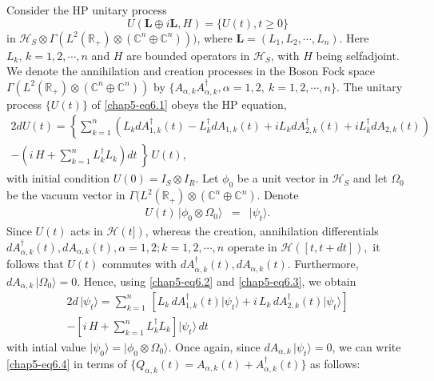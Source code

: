 Consider the HP unitary process 
\begin{equation} 
U(\mathbf{L}\oplus i\mathbf{L}, H)=\{U(t), t\geq 0\} \label{chap5-eq6.1}
\end{equation}
in $\mathcal{H}_S\otimes \Gamma(L^2(\mathbb{R}_+)\otimes (\mathbb{C}^{n}\oplus \mathbb{C}^{n})))$, where $\mathbf{L}=(L_1,L_2,\cdots, L_n)$. Here  $L_k,\, k=1,2,\cdots, n$ and $H$ are  bounded operators in  $\mathcal{H}_S$, with $H$ being selfadjoint.  We denote the annihilation and creation processes in the Boson Fock space $\Gamma(L^2(\mathbb{R}_+)\otimes (\mathbb{C}^{n}\oplus \mathbb{C}^{n}))$ by $\{A_{\alpha,k} A^\dag_{\alpha,k}, \alpha=1,2,\ k=1,2,\cdots, n\}$. The unitary process $\{U(t)\}$ of \eqref{chap5-eq6.1} obeys the HP  equation,
\begin{multline}{2}
dU(t)= \left\{ \sum_{k=1}^{n} \left(L_k dA_{1,k}^\dag(t) - L^\dag_k dA_{1,k}(t)+ i L_k dA_{2,k}^\dag(t) + iL^\dag_k dA_{2,k}(t)\right)\right. \\ 
 \left. -\left(i\, H+\sum_{k=1}^{n}L^\dag_k L_k\right) dt\ \right\}\, U(t), \label{chap5-eq6.2}
\end{multline}  
with initial condition $U(0)=I_S\otimes I_R.$  
Let $\phi_0$ be a unit vector in $\mathcal{H}_S$ and let $\Omega_0$ be the vacuum vector in  $\Gamma(L^2(\mathbb{R}_+)\otimes (\mathbb{C}^{n}\oplus \mathbb{C}^{n})$. 
Denote 
\begin{eqnarray}
U(t)\, \vert\phi_0\otimes \Omega_0\rangle&=&\vert\psi_t\rangle. \label{chap5-eq6.3}
\end{eqnarray}
Since $U(t)$ acts in $\mathcal{H}(t])$, whereas the creation, annihilation differentials  
$dA^\dag_{\alpha,k}(t), dA_{\alpha, k}(t), \alpha=1,2; k=1,2,\cdots, n$ operate in $\mathcal{H}([t, t+dt]),$  
it follows that  $U(t)$  commutes with $dA^\dag_{\alpha,k}(t), dA_{\alpha, k}(t)$. Furthermore, 
$dA_{\alpha, k}\,\vert\Omega_0\rangle=0$. Hence, using \eqref{chap5-eq6.2} and \eqref{chap5-eq6.3}, we obtain
\begin{multline}{2}
d\,\vert\psi_t\rangle =\sum_{k=1}^{n}\, \left[L_k\,  dA_{1,k}^\dag(t) \vert\psi_t\rangle 
+ i\,L_k\, dA_{2,k}^\dag(t) \vert\psi_t\rangle\right] \\
-\left[i\, H+\sum_{k=1}^{n}L^\dag_k L_k\right]\vert\psi_t\rangle \, dt \label{chap5-eq6.4}
\end{multline}  
with intial value $\vert\psi_0\rangle=\vert\phi_0\otimes \Omega_0\rangle$. Once again, since $dA_{\alpha, k}\,\vert\psi_t\rangle=0$, we can write \eqref{chap5-eq6.4} in terms of  $\{Q_{\alpha,k}(t)=A_{\alpha,k}(t)+A^\dag_{\alpha,k}(t)\}$ as follows:    
